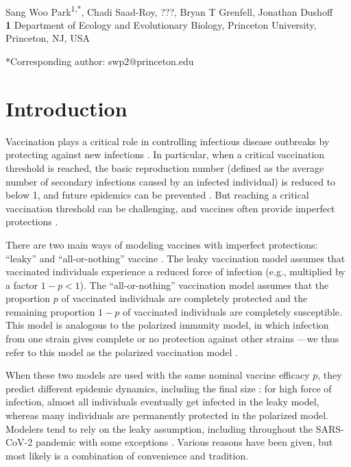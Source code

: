 \documentclass[12pt]{article}
\date{\today}
\begin{document}
\begin{flushleft}{
	\Large
	\textbf{}
}
\newline
\\
Sang Woo Park\textsuperscript{1,*}, Chadi Saad-Roy, ???, Bryan T Grenfell, Jonathan Dushoff
\\
\bigskip
\textbf{1} Department of Ecology and Evolutionary Biology, Princeton University, Princeton, NJ, USA
\\
\bigskip

*Corresponding author: swp2@princeton.edu
\end{flushleft}

\section*{Introduction}

Vaccination plays a critical role in controlling infectious disease outbreaks by protecting against new infections \citep{iwasaki2020and}.
In particular, when a critical vaccination threshold is reached, the basic reproduction number (defined as the average number of secondary infections caused by an infected individual) is reduced to below 1, and future epidemics can be prevented \citep{anderson1985vaccination}.
But reaching a critical vaccination threshold can be challenging, and vaccines often provide imperfect protections \citep{gandon2003imperfect,anderson2020challenges}.

There are two main ways of modeling vaccines with imperfect protections: ``leaky'' and ``all-or-nothing'' vaccine \citep{smith1984assessment}.
The leaky vaccination model assumes that vaccinated individuals experience a reduced force of infection (e.g., multiplied by a factor $1-p < 1$).
The ``all-or-nothing'' vaccination model assumes that the proportion $p$ of vaccinated individuals are completely protected and the remaining proportion $1-p$ of vaccinated individuals are completely susceptible.
This model is analogous to the polarized immunity model, in which infection from one strain gives complete or no protection against other strains \citep{gog2002dynamics}---we thus refer to this model as the polarized vaccination model \citep{gomes2014missing}.

When these two models are used with the same nominal vaccine efficacy $p$, they predict different epidemic dynamics, including the final size \citep{smith1984assessment}:
for high force of infection, almost all individuals eventually get infected in the leaky model, whereas many individuals are permanently protected in the polarized model.
Modelers tend to rely on the leaky assumption, including throughout the SARS-CoV-2 pandemic \citep{dyson2021possible,gozzi2021importance,marziano2021vaccine,matrajt2021vaccine,park2022intermediate} with some exceptions \citep{bubar2021model,buckner2021dynamic}.
Various reasons have been given, but most likely is a combination of convenience and tradition.
\end{document}
